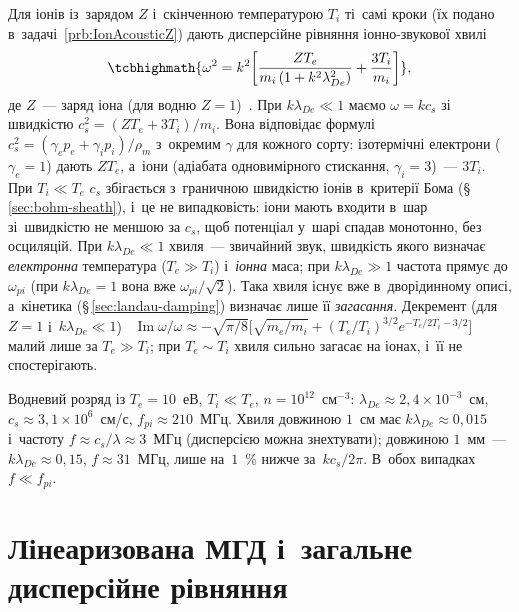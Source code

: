 Для іонів із~зарядом $Z$ і~скінченною температурою $T_i$ ті~самі кроки (їх подано в~задачі~\ref{prb:IonAcousticZ}) дають дисперсійне рівняння іонно-звукової хвилі
\begin{equation}\label{eq:ion-acoustic}
	\tcbhighmath{\omega^2=k^2\biggl[\frac{ZT_e}{m_i\,(1+k^2\lambda_{De}^2)}+\frac{3T_i}{m_i}\biggr]},
\end{equation}
де $Z$~--- заряд іона (для водню $Z=1$)~\cite{chen2016introduction}. При $k\lambda_{De}\ll1$ маємо $\omega=kc_s$ зі швидкістю
$c_s^2=(ZT_e+3T_i)/m_i$. Вона відповідає формулі
$c_s^2=(\gamma_ep_e+\gamma_ip_i)/\rho_m$ з~окремим $\gamma$ для кожного сорту: ізотермічні електрони
($\gamma_e=1$) дають $ZT_e$, а~іони (адіабата одновимірного стискання, $\gamma_i=3$)~--- $3T_i$.
При $T_i\ll T_e$ $c_s$ збігається з~граничною швидкістю іонів
в~критерії Бома (§\,\ref{sec:bohm-sheath}), і~це не випадковість: іони мають входити в~шар
зі~швидкістю не меншою за $c_s$, щоб потенціал у~шарі спадав монотонно, без осциляцій.
При $k\lambda_{De}\ll1$ хвиля~--- звичайний звук, швидкість якого визначає
\emph{електронна} температура ($T_e\gg T_i$) і~\emph{іонна} маса; при $k\lambda_{De}\gg1$ частота
прямує до $\omega_{pi}$ (при $k\lambda_{De}=1$ вона вже $\omega_{pi}/\sqrt2$). Така хвиля існує вже в~дворідинному описі, а~кінетика (§\,\ref{sec:landau-damping})
визначає лише її \emph{загасання}. Декремент (для $Z=1$ і~$k\lambda_{De}\ll1$)~\cite{chen2016introduction}
$\operatorname{Im}\omega/\omega\approx-\sqrt{\pi/8}\bigl[\sqrt{m_e/m_i}+(T_e/T_i)^{3/2}e^{-T_e/2T_i-3/2}\bigr]$
малий лише за $T_e\gg T_i$; при $T_e\sim T_i$ хвиля сильно загасає на іонах, і~її не спостерігають.

\begin{Estimate}
Водневий розряд із $T_e=10$~еВ, $T_i\ll T_e$, $n=10^{12}$~см$^{-3}$: $\lambda_{De}\approx2{,}4\times10^{-3}$~см,
$c_s\approx3{,}1\times10^{6}$~см/с, $f_{pi}\approx210$~МГц. Хвиля довжиною $1$~см має
$k\lambda_{De}\approx0{,}015$ і~частоту $f\approx c_s/\lambda\approx3$~МГц (дисперсією можна знехтувати);
довжиною $1$~мм~--- $k\lambda_{De}\approx0{,}15$, $f\approx31$~МГц, лише на~$1$~\% нижче за~$kc_s/2\pi$.
В~обох випадках $f\ll f_{pi}$.
\end{Estimate}


\section{Лінеаризована МГД і~загальне дисперсійне рівняння}\label{sec:linear-mhd}



